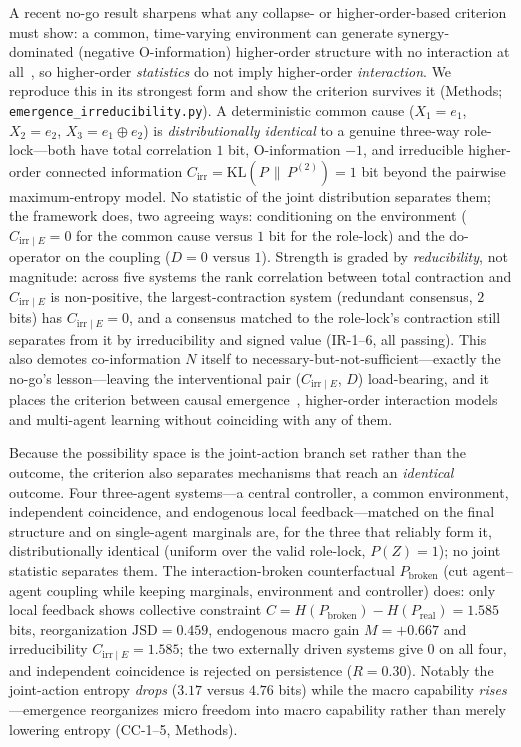 \documentclass[11pt]{article}
\theoremstyle{definition}
\begin{document}
A recent no-go result sharpens what any collapse- or higher-order-based
criterion must show: a common, time-varying environment can generate
synergy-dominated (negative O-information) higher-order structure with
no interaction at all~\cite{envdriven2026}, so higher-order
\emph{statistics} do not imply higher-order \emph{interaction}. We
reproduce this in its strongest form and show the criterion survives it
(Methods; \texttt{emergence\_irreducibility.py}). A deterministic common
cause ($X_1{=}e_1$, $X_2{=}e_2$, $X_3{=}e_1{\oplus}e_2$) is
\emph{distributionally identical} to a genuine three-way role-lock---both
have total correlation $1$ bit, O-information $-1$, and irreducible
higher-order connected information $C_{\mathrm{irr}}=\mathrm{KL}(P\,\|\,P^{(2)})=1$
bit beyond the pairwise maximum-entropy model. No statistic of the joint
distribution separates them; the framework does, two agreeing ways:
conditioning on the environment ($C_{\mathrm{irr}\mid E}=0$ for the common
cause versus $1$ bit for the role-lock) and the do-operator on the
coupling ($D=0$ versus $1$). Strength is graded by \emph{reducibility},
not magnitude: across five systems the rank correlation between total
contraction and $C_{\mathrm{irr}\mid E}$ is non-positive, the
largest-contraction system (redundant consensus, $2$ bits) has
$C_{\mathrm{irr}\mid E}=0$, and a consensus matched to the role-lock's
contraction still separates from it by irreducibility and signed value
(IR-1--6, all passing). This also demotes co-information $N$ itself to
necessary-but-not-sufficient---exactly the no-go's lesson---leaving the
interventional pair ($C_{\mathrm{irr}\mid E}$, $D$) load-bearing, and it
places the criterion between causal emergence~\cite{hoel2013,
hoelce2}, higher-order interaction models~\cite{pithon2025} and
multi-agent learning without coinciding with any of them.

Because the possibility space is the joint-action branch set rather than
the outcome, the criterion also separates mechanisms that reach an
\emph{identical} outcome. Four three-agent systems---a central
controller, a common environment, independent coincidence, and
endogenous local feedback---matched on the final structure and on
single-agent marginals are, for the three that reliably form it,
distributionally identical (uniform over the valid role-lock,
$P(Z){=}1$); no joint statistic separates them. The interaction-broken
counterfactual $P_{\mathrm{broken}}$ (cut agent--agent coupling while
keeping marginals, environment and controller) does: only local feedback
shows collective constraint $C=H(P_{\mathrm{broken}})-H(P_{\mathrm{real}})=1.585$
bits, reorganization $\mathrm{JSD}=0.459$, endogenous macro gain
$M=+0.667$ and irreducibility $C_{\mathrm{irr}\mid E}=1.585$; the two
externally driven systems give $0$ on all four, and independent
coincidence is rejected on persistence ($R=0.30$). Notably the
joint-action entropy \emph{drops} ($3.17$ versus $4.76$ bits) while the
macro capability \emph{rises}---emergence reorganizes micro freedom into
macro capability rather than merely lowering entropy (CC-1--5,
Methods).
\end{document}
